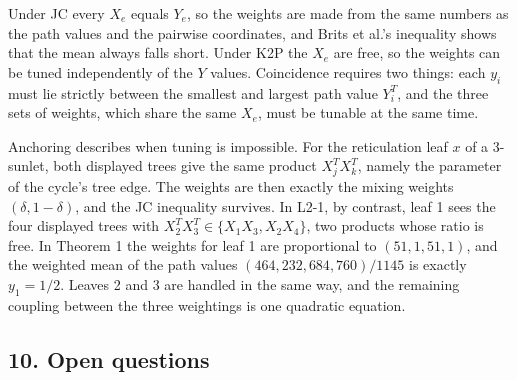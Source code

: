 \documentclass[
  11pt,
]{article}
\begin{document}
Under JC every \(X_e\) equals \(Y_e\), so the weights are made from the
same numbers as the path values and the pairwise coordinates, and Brits
et al.'s inequality shows that the mean always falls short. Under K2P
the \(X_e\) are free, so the weights can be tuned independently of the
\(Y\) values. Coincidence requires two things: each \(y_i\) must lie
strictly between the smallest and largest path value \(Y_i^T\), and the
three sets of weights, which share the same \(X_e\), must be tunable at
the same time.

Anchoring describes when tuning is impossible. For the reticulation leaf
\(x\) of a 3-sunlet, both displayed trees give the same product
\(X_j^TX_k^T\), namely the parameter of the cycle's tree edge. The
weights are then exactly the mixing weights \((\delta,1-\delta)\), and
the JC inequality survives. In L2-1, by contrast, leaf 1 sees the four
displayed trees with \(X_2^TX_3^T \in \{X_1X_3, X_2X_4\}\), two products
whose ratio is free. In Theorem 1 the weights for leaf 1 are
proportional to \((51,1,51,1)\), and the weighted mean of the path
values \((464, 232, 684, 760)/1145\) is exactly \(y_1 = 1/2\). Leaves 2
and 3 are handled in the same way, and the remaining coupling between
the three weightings is one quadratic equation.

\subsection{10. Open questions}\label{open-questions}
\end{document}
